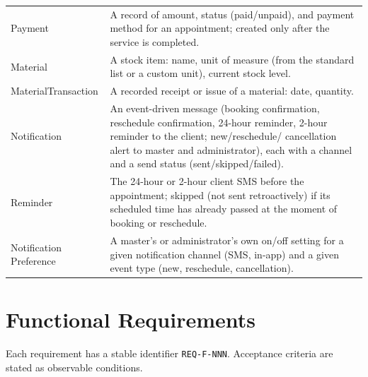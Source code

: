 \documentclass[11pt,a4paper]{article}
\begin{document}
\begin{longtable}{L{3.4cm}L{10.6cm}}
Payment &
A record of amount, status (paid/unpaid), and payment method for an
appointment; created only after the service is completed. \\

Material &
A stock item: name, unit of measure (from the standard list or a custom
unit), current stock level. \\

MaterialTransaction &
A recorded receipt or issue of a material: date, quantity. \\

Notification &
An event-driven message (booking confirmation, reschedule confirmation,
24-hour reminder, 2-hour reminder to the client; new/reschedule/
cancellation alert to master and administrator), each with a channel and
a send status (sent/skipped/failed). \\

Reminder &
The 24-hour or 2-hour client SMS before the appointment; skipped (not sent
retroactively) if its scheduled time has already passed at the moment of
booking or reschedule. \\

Notification Preference &
A master's or administrator's own on/off setting for a given notification
channel (SMS, in-app) and a given event type (new, reschedule,
cancellation). \\

\bottomrule
\end{longtable}

\section{Functional Requirements}
\label{sec:functional}

Each requirement has a stable identifier \texttt{REQ-F-NNN}. Acceptance
criteria are stated as observable conditions.
\end{document}
